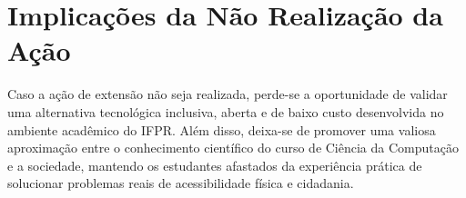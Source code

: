 \section{Implicações da Não Realização da Ação}
\label{sec:nao-realizacao-proposta}

Caso a ação de extensão não seja realizada, perde-se a oportunidade de validar uma alternativa tecnológica inclusiva, aberta e de baixo custo desenvolvida no ambiente acadêmico do IFPR. Além disso, deixa-se de promover uma valiosa aproximação entre o conhecimento científico do curso de Ciência da Computação e a sociedade, mantendo os estudantes afastados da experiência prática de solucionar problemas reais de acessibilidade física e cidadania.
